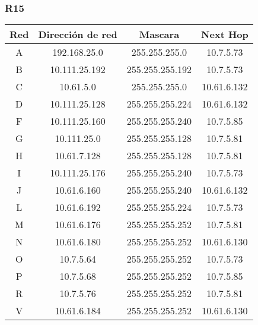 \subsubsection{R15}
\begin{table}[!htbp]
\centering
  \begin{tabular}{|c|c|c|c|}
    \hline
	Red & Dirección de red & Mascara & Next Hop\\ \hline
	A & 192.168.25.0 & 255.255.255.0 & 10.7.5.73 \\ \hline
	B & 10.111.25.192 & 255.255.255.192 & 10.7.5.73 \\ \hline
	C & 10.61.5.0 & 255.255.255.0 & 10.61.6.132 \\ \hline
	D & 10.111.25.128 & 255.255.255.224 & 10.61.6.132 \\ \hline
	F & 10.111.25.160 & 255.255.255.240 & 10.7.5.85 \\ \hline
	G & 10.111.25.0 & 255.255.255.128 & 10.7.5.81 \\ \hline
	H & 10.61.7.128 & 255.255.255.128 & 10.7.5.81 \\ \hline
	I & 10.111.25.176 & 255.255.255.240 & 10.7.5.73 \\ \hline
	J & 10.61.6.160 & 255.255.255.240 & 10.61.6.132 \\ \hline
	L & 10.61.6.192 & 255.255.255.224 & 10.7.5.73 \\ \hline
	M & 10.61.6.176 & 255.255.255.252 & 10.7.5.81 \\ \hline
	N & 10.61.6.180 & 255.255.255.252 & 10.61.6.130 \\ \hline
	O & 10.7.5.64 & 255.255.255.252 & 10.7.5.73 \\ \hline
	P & 10.7.5.68 & 255.255.255.252 & 10.7.5.85 \\ \hline
	R & 10.7.5.76 & 255.255.255.252 & 10.7.5.81 \\ \hline
	V & 10.61.6.184 & 255.255.255.252 & 10.61.6.130 \\
    \hline
  \end{tabular}
\end{table}

\newpage
